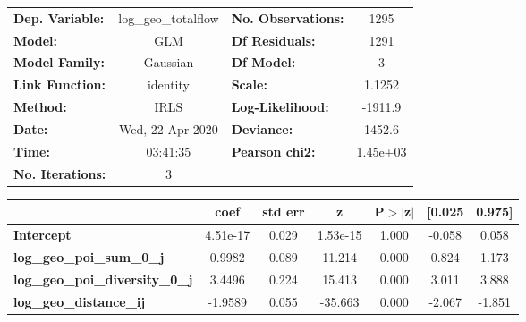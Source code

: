 \begin{center}
\begin{tabular}{lclc}
\toprule
\textbf{Dep. Variable:}                 & log\_geo\_totalflow & \textbf{  No. Observations:  } &     1295    \\
\textbf{Model:}                         &         GLM         & \textbf{  Df Residuals:      } &     1291    \\
\textbf{Model Family:}                  &       Gaussian      & \textbf{  Df Model:          } &        3    \\
\textbf{Link Function:}                 &       identity      & \textbf{  Scale:             } &    1.1252   \\
\textbf{Method:}                        &         IRLS        & \textbf{  Log-Likelihood:    } &   -1911.9   \\
\textbf{Date:}                          &   Wed, 22 Apr 2020  & \textbf{  Deviance:          } &    1452.6   \\
\textbf{Time:}                          &       03:41:35      & \textbf{  Pearson chi2:      } &  1.45e+03   \\
\textbf{No. Iterations:}                &          3          & \textbf{                     } &             \\
\bottomrule
\end{tabular}
\begin{tabular}{lcccccc}
                                        & \textbf{coef} & \textbf{std err} & \textbf{z} & \textbf{P$> |$z$|$} & \textbf{[0.025} & \textbf{0.975]}  \\
\midrule
\textbf{Intercept}                      &     4.51e-17  &        0.029     &  1.53e-15  &         1.000        &       -0.058    &        0.058     \\
\textbf{log\_geo\_poi\_sum\_0\_j}       &       0.9982  &        0.089     &    11.214  &         0.000        &        0.824    &        1.173     \\
\textbf{log\_geo\_poi\_diversity\_0\_j} &       3.4496  &        0.224     &    15.413  &         0.000        &        3.011    &        3.888     \\
\textbf{log\_geo\_distance\_ij}         &      -1.9589  &        0.055     &   -35.663  &         0.000        &       -2.067    &       -1.851     \\
\bottomrule
\end{tabular}
\end{center}